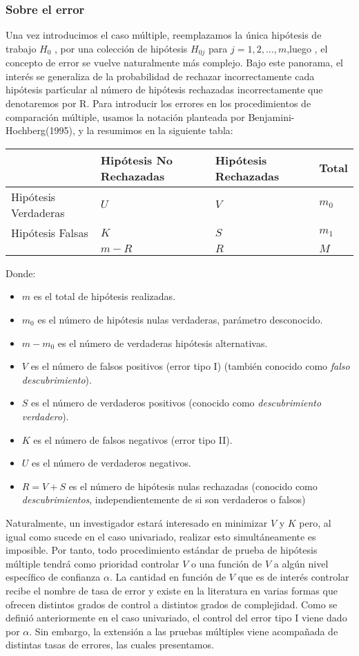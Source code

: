 \documentclass{article}
\theoremstyle{definition}
\begin{document}
\subsubsection{Sobre el error}
Una vez introducimos el caso múltiple, reemplazamos la única hipótesis de trabajo $H_0$ , por una colección de hipótesis $H_{0j}$ para $j = 1, 2, \dots, m$,luego , el concepto de error se vuelve naturalmente más
complejo. Bajo este panorama, el interés se generaliza de la probabilidad de rechazar incorrectamente
cada hipótesis partı́cular al número de hipótesis rechazadas incorrectamente que denotaremos por R. Para introducir los errores en los procedimientos de comparación múltiple, usamos la notación planteada por Benjamini-Hochberg(1995), y la resumimos en la siguiente tabla:
\begin{center}
\begin{tabular}{|l|l|l|l|}
	\hline & Hipótesis No Rechazadas & Hipótesis Rechazadas & Total \\
	\hline Hipótesis Verdaderas & $U$ & $V$ & $m_{0}$ \\
	Hipótesis Falsas & $K$ & $S$ & $m_{1}$ \\
	\hline & $m-R$ & $R$ & $M$ \\
	\hline
\end{tabular}	
\end{center}

Donde:
\begin{itemize}
	\item $m$ es el total de hipótesis realizadas.
	\item $m_0$ es el número de hipótesis nulas verdaderas, parámetro desconocido.
	\item $m-m_0$ es el número de verdaderas hipótesis alternativas.
	\item $V$ es el número de falsos positivos (error tipo I) (también conocido como \textit{falso descubrimiento}).
	\item $S$ es el número de verdaderos positivos (conocido como \textit{descubrimiento verdadero}).
	\item $K$ es el número de falsos negativos (error tipo II).
	\item $U$ es el número de verdaderos negativos.
	\item $R=V+S$ es el número de hipótesis nulas rechazadas (conocido como \textit{descubrimientos}, independientemente de si son verdaderos o falsos)
\end{itemize}


Naturalmente, un investigador estará interesado en minimizar $V$ y $K$ pero, al igual como sucede en el caso univariado, realizar esto simultáneamente es imposible. Por tanto, todo procedimiento estándar de prueba de hipótesis múltiple tendrá como prioridad controlar $V$ o una función de $V$ a algún nivel específico de confianza $\alpha$. La cantidad en función de $V$ que es de interés controlar recibe el nombre de tasa de error y existe en la literatura en varias formas que ofrecen distintos grados de control a distintos grados de complejidad. Como se definió anteriormente en el caso univariado, el control del error tipo I viene dado por $\alpha$. Sin embargo, la extensión a las pruebas múltiples viene acompañada de distintas tasas de errores, las cuales presentamos.
\end{document}
